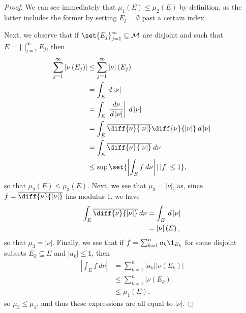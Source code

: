 \documentclass[10pt]{mypackage}
\begin{document}
\begin{proof}
  We can see immediately that $\mu_1(E)\leq \mu_2(E)$ by definition, as the latter includes the former by setting $E_j = \emptyset$ past a certain index.\newline

  Next, we observe that if $\set{E_j}_{j=1}^{\infty}\subseteq \mathcal{M}$ are disjoint and such that $E  = \bigsqcup_{j=1}^{\infty}E_j$, then
  \begin{align*}
    \sum_{j=1}^{\infty}\left\vert \nu\left( E_j \right) \right\vert &\leq \sum_{j=1}^{\infty}\left\vert \nu \right\vert\left( E_j \right)\\
                                                                    &= \int_{E}^{} \:d\left\vert \nu \right\vert\\
                                                                    &= \int_{E}^{} \left\vert \frac{d\nu}{d\left\vert \nu \right\vert} \right\vert\:d\left\vert \nu \right\vert\\
                                                                    &= \int_{E}^{} \overline{\diff{\nu}{\left\vert \nu \right\vert}}\diff{\nu}{\left\vert \nu \right\vert}\:d\left\vert \nu \right\vert\\
                                                                    &= \int_{E}^{} \overline{\diff{\nu}{\left\vert \nu \right\vert}}\:d\nu\\
                                                                    &\leq \sup\set{ \left\vert \int_{E}^{} f\:d\nu \right\vert | \left\vert f \right\vert \leq 1},
  \end{align*}
  so that $\mu_2(E) \leq \mu_3(E)$. Next, we see that $\mu_3 = \left\vert \nu \right\vert$, as, since $f = \overline{\diff{\nu}{\left\vert \nu \right\vert}}$ has modulus $1$, we have
  \begin{align*}
    \int_{E}^{} \overline{\diff{\nu}{\left\vert \nu \right\vert}}\:d\nu &= \int_{E}^{} \:d\left\vert \nu \right\vert\\
                                                                        &= \left\vert \nu \right\vert\left( E \right),
  \end{align*}
  so that $\mu_3 = \left\vert \nu \right\vert$. Finally, we see that if $f = \sum_{k=1}^{n}a_k\1_{E_k}$ for some disjoint subsets $E_k\subseteq E$ and $\left\vert a_k \right\vert \leq 1$, then
  \begin{align*}
    \left\vert \int_{E}^{} f\:d\nu \right\vert &= \sum_{k=1}^{n} \left\vert a_k \right\vert\left\vert \nu\left( E_k \right) \right\vert\\
                                               &\leq \sum_{k=1}^{n} \left\vert \nu\left( E_k \right) \right\vert\\
                                               &\leq \mu_1\left( E \right),
  \end{align*}
  so $\mu_3\leq \mu_1$, and thus these expressions are all equal to $\left\vert \nu \right\vert$.
\end{proof}
\end{document}

